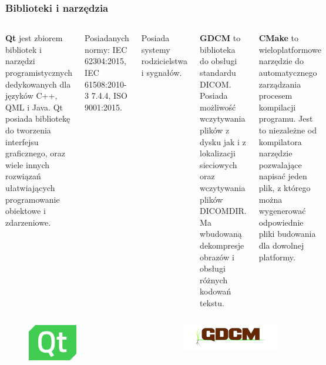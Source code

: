 \documentclass[aspectratio=169]{beamer}
\begin{document}
\begin{frame}[t]
    \frametitle{Biblioteki i narzędzia}

    \begin{columns}[t]
        \textbf{\LARGE Qt}
        \scriptsize
        jest zbiorem bibliotek i narzędzi programistycznych dedykowanych dla języków C++, QML i Java.
        Qt posiada bibliotekę do tworzenia interfejsu graficznego, oraz wiele innych rozwiązań ułatwiających programowanie obiektowe i zdarzeniowe.

        Posiadanych normy: IEC 62304:2015, IEC 61508:2010-3 7.4.4, ISO 9001:2015.

        Posiada systemy rodzicielstwa i sygnałów.

        \textbf{\LARGE GDCM}
        \scriptsize
        to biblioteka do obsługi standardu DICOM.
        Posiada możliwość wczytywania plików z dysku jak i z lokalizacji sieciowych oraz wczytywania plików DICOMDIR.
        Ma wbudowaną dekompresje obrazów i obsługi różnych kodowań tekstu.

        \textbf{\LARGE CMake}
        \scriptsize
        to wieloplatformowe narzędzie do automatycznego zarządzania procesem kompilacji programu.
        Jest to niezależne od kompilatora narzędzie pozwalające napisać jeden plik, z którego można wygenerować odpowiednie pliki budowania dla dowolnej platformy.

    \end{columns}


    \begin{columns}[c]

        \begin{figure}
            \includegraphics[width=0.5\textwidth]{img/logo-qt.png}
        \end{figure}

        \begin{figure}
            \includegraphics[width=1\textwidth]{img/logo-gdcm.png}
        \end{figure}


\end{columns}
\end{frame}
\end{document}
